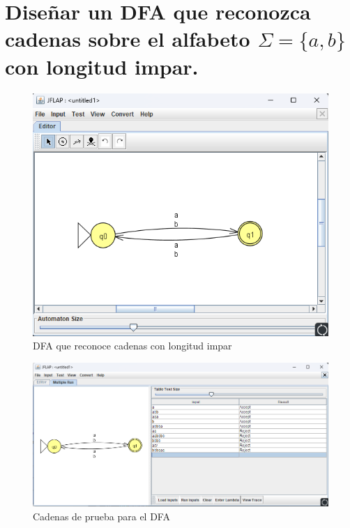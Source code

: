 \documentclass[11pt]{report}
\begin{document}
\newpage

\section{Diseñar un DFA que reconozca cadenas sobre el alfabeto $\Sigma = \{a, b\}$ con longitud impar.}
\begin{figure}[H]
  \centering
  \includegraphics[scale=0.7]{img/DFA_02.png}
  \caption{DFA que reconoce cadenas con longitud impar}
\end{figure}

\begin{figure}[H]
  \centering
  \includegraphics[scale=0.65]{img/DFA_02_test.png}
  \caption{Cadenas de prueba para el DFA}
\end{figure}

\newpage
\end{document}
